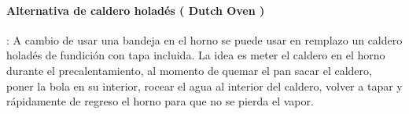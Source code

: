 \paragraph{Alternativa de caldero holadés ( Dutch Oven )}: A cambio de usar una bandeja en el horno se puede usar en remplazo un caldero holadés de fundición con tapa incluida. La idea es meter el caldero en el horno durante el precalentamiento, al momento de quemar el pan sacar el caldero, poner la bola en su interior, rocear el agua al interior del caldero, volver a tapar y rápidamente de regreso el horno para que no se pierda el vapor.
